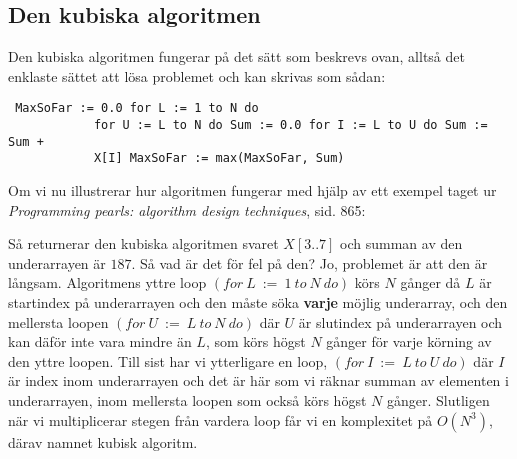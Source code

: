 \documentclass[a4paper,12pt]{article} \usepackage[swedish]{babel}
\begin{document}
            \subsection*{Den kubiska algoritmen} \label{sec:kubisk} Den
            kubiska algoritmen fungerar på det sätt som beskrevs ovan,
            alltså det enklaste sättet att lösa problemet och kan skrivas
            som sådan: \begin{verbatim} MaxSoFar := 0.0 for L := 1 to N do
            for U := L to N do Sum := 0.0 for I := L to U do Sum := Sum +
            X[I] MaxSoFar := max(MaxSoFar, Sum) \end{verbatim}
            \pagebreak Om vi nu illustrerar hur algoritmen fungerar med
            hjälp av ett exempel taget ur \textit{Programming pearls:
            algorithm design techniques}, sid. 865: \begin{center}
            \end{center} Så returnerar den kubiska algoritmen svaret
            $X[3..7]$ och summan av den underarrayen är $187$. Så vad är
            det för fel på den? Jo, problemet är att den är långsam.
            Algoritmens yttre loop $(for~L~:=~1~to~N~do)$ körs $N$ gånger
            då $L$ är startindex på underarrayen och den måste söka
            \textbf{varje} möjlig underarray, och den mellersta loopen
            $(for~U~:=~L~to~N~do)$ där $U$ är slutindex på underarrayen och
            kan däför inte vara mindre än $L$, som körs högst $N$ gånger
            för varje körning av den yttre loopen. Till sist har vi
            ytterligare en loop, $(for~I~:=~L~to~U~do)$ där $I$ är index
            inom underarrayen och det är här som vi räknar summan av
            elementen i underarrayen, inom mellersta loopen som också körs
            högst $N$ gånger. Slutligen när vi multiplicerar stegen från
            vardera loop får vi en komplexitet på $O\left(N^3\right)$,
            därav namnet kubisk algoritm.
\end{document}
